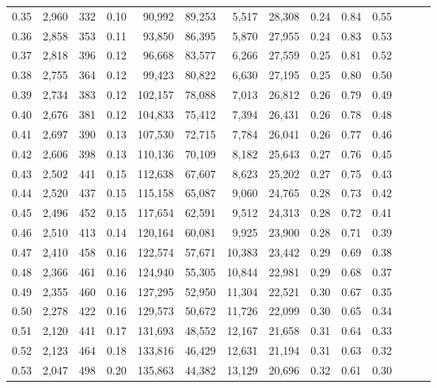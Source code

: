 \begin{tabular}{rrrrrrrrrrrrrr}
0.35 &  2,960 &  332 &  0.10 &   90,992 &   89,253 &   5,517 &  28,308 &  0.24 &  0.84 &      0.55 \\
0.36 &  2,858 &  353 &  0.11 &   93,850 &   86,395 &   5,870 &  27,955 &  0.24 &  0.83 &      0.53 \\
0.37 &  2,818 &  396 &  0.12 &   96,668 &   83,577 &   6,266 &  27,559 &  0.25 &  0.81 &      0.52 \\
0.38 &  2,755 &  364 &  0.12 &   99,423 &   80,822 &   6,630 &  27,195 &  0.25 &  0.80 &      0.50 \\
0.39 &  2,734 &  383 &  0.12 &  102,157 &   78,088 &   7,013 &  26,812 &  0.26 &  0.79 &      0.49 \\
0.40 &  2,676 &  381 &  0.12 &  104,833 &   75,412 &   7,394 &  26,431 &  0.26 &  0.78 &      0.48 \\
0.41 &  2,697 &  390 &  0.13 &  107,530 &   72,715 &   7,784 &  26,041 &  0.26 &  0.77 &      0.46 \\
0.42 &  2,606 &  398 &  0.13 &  110,136 &   70,109 &   8,182 &  25,643 &  0.27 &  0.76 &      0.45 \\
0.43 &  2,502 &  441 &  0.15 &  112,638 &   67,607 &   8,623 &  25,202 &  0.27 &  0.75 &      0.43 \\
0.44 &  2,520 &  437 &  0.15 &  115,158 &   65,087 &   9,060 &  24,765 &  0.28 &  0.73 &      0.42 \\
0.45 &  2,496 &  452 &  0.15 &  117,654 &   62,591 &   9,512 &  24,313 &  0.28 &  0.72 &      0.41 \\
0.46 &  2,510 &  413 &  0.14 &  120,164 &   60,081 &   9,925 &  23,900 &  0.28 &  0.71 &      0.39 \\
0.47 &  2,410 &  458 &  0.16 &  122,574 &   57,671 &  10,383 &  23,442 &  0.29 &  0.69 &      0.38 \\
0.48 &  2,366 &  461 &  0.16 &  124,940 &   55,305 &  10,844 &  22,981 &  0.29 &  0.68 &      0.37 \\
0.49 &  2,355 &  460 &  0.16 &  127,295 &   52,950 &  11,304 &  22,521 &  0.30 &  0.67 &      0.35 \\
0.50 &  2,278 &  422 &  0.16 &  129,573 &   50,672 &  11,726 &  22,099 &  0.30 &  0.65 &      0.34 \\
0.51 &  2,120 &  441 &  0.17 &  131,693 &   48,552 &  12,167 &  21,658 &  0.31 &  0.64 &      0.33 \\
0.52 &  2,123 &  464 &  0.18 &  133,816 &   46,429 &  12,631 &  21,194 &  0.31 &  0.63 &      0.32 \\
0.53 &  2,047 &  498 &  0.20 &  135,863 &   44,382 &  13,129 &  20,696 &  0.32 &  0.61 &      0.30 \\

\end{tabular}
